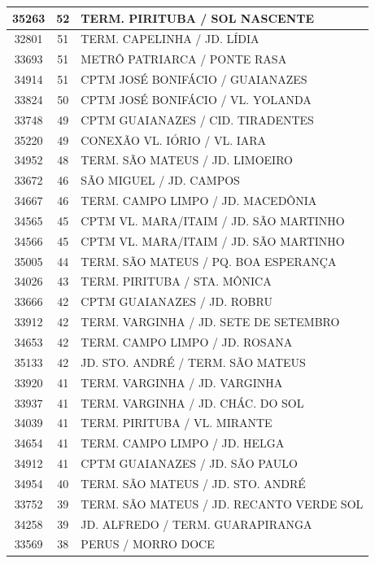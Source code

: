 \documentclass[
	12pt,				%
	oneside,			%
	a4paper,			%
	english,			%
	brazil				%
	]{abntex2ppgsi}
\begin{document}
{{\begin{apendicesenv}
\begin{longtable}{c|c|p{7cm}}
 \hline 
35263 &	52 &	TERM. PIRITUBA / SOL NASCENTE \\ 
 \hline 
32801 &	51 &	TERM. CAPELINHA / JD. LÍDIA \\ 
 \hline 
33693 &	51 &	METRÔ PATRIARCA / PONTE RASA \\ 
 \hline 
34914 &	51 &	CPTM JOSÉ BONIFÁCIO / GUAIANAZES \\ 
 \hline 
33824 &	50 &	CPTM JOSÉ BONIFÁCIO / VL. YOLANDA \\ 
 \hline 
33748 &	49 &	CPTM GUAIANAZES / CID. TIRADENTES \\ 
 \hline 
35220 &	49 &	CONEXÃO VL. IÓRIO / VL. IARA \\ 
 \hline 
34952 &	48 &	TERM. SÃO MATEUS / JD. LIMOEIRO \\ 
 \hline 
33672 &	46 &	SÃO MIGUEL / JD. CAMPOS \\ 
 \hline 
34667 &	46 &	TERM. CAMPO LIMPO / JD. MACEDÔNIA \\ 
 \hline 
34565 &	45 &	CPTM VL. MARA/ITAIM / JD. SÃO MARTINHO \\ 
 \hline 
34566 &	45 &	CPTM VL. MARA/ITAIM / JD. SÃO MARTINHO \\ 
 \hline 
35005 &	44 &	TERM. SÃO MATEUS / PQ. BOA ESPERANÇA \\ 
 \hline 
34026 &	43 &	TERM. PIRITUBA / STA. MÔNICA \\ 
 \hline 
33666 &	42 &	CPTM GUAIANAZES / JD. ROBRU \\ 
 \hline 
33912 &	42 &	TERM. VARGINHA / JD. SETE DE SETEMBRO \\ 
 \hline 
34653 &	42 &	TERM. CAMPO LIMPO / JD. ROSANA \\ 
 \hline 
35133 &	42 &	JD. STO. ANDRÉ / TERM. SÃO MATEUS \\ 
 \hline 
33920 &	41 &	TERM. VARGINHA / JD. VARGINHA \\ 
 \hline 
33937 &	41 &	TERM. VARGINHA / JD. CHÁC. DO SOL \\ 
 \hline 
34039 &	41 &	TERM. PIRITUBA / VL. MIRANTE \\ 
 \hline 
34654 &	41 &	TERM. CAMPO LIMPO / JD. HELGA \\ 
 \hline 
34912 &	41 &	CPTM GUAIANAZES / JD. SÃO PAULO \\ 
 \hline 
34954 &	40 &	TERM. SÃO MATEUS / JD. STO. ANDRÉ \\ 
 \hline 
33752 &	39 &	TERM. SÃO MATEUS / JD. RECANTO VERDE SOL \\ 
 \hline 
34258 &	39 &	JD. ALFREDO / TERM. GUARAPIRANGA \\ 
 \hline 
33569 &	38 &	PERUS / MORRO DOCE \\ 

\end{longtable}
\end{apendicesenv}}}
\end{document}
